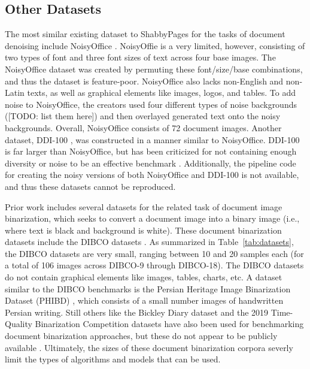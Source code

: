 \documentclass[runningheads]{llncs}
\begin{document}
\subsection{Other Datasets}
The most similar existing dataset to ShabbyPages for the tasks of document denoising include NoisyOffice \cite{ref_NoisyOfficeDatabase}.
NoisyOffie is a very limited, however, consisting of two types of font and three font sizes of text across four base images. The NoisyOffice dataset was created by permuting these font/size/base combinations, and thus the dataset is feature-poor.
NoisyOffice also lacks non-English and non-Latin texts, as well as graphical elements like images, logos, and tables.
To add noise to NoisyOffice, the creators used four different types of noise backgrounds ([TODO: list them here]) and then overlayed generated text onto the noisy backgrounds.
Overall, NoisyOffice consists of 72 document images.
Another dataset, DDI-100 \cite{ddi-100-2019}, was constructed in a manner similar to NoisyOffice.
DDI-100 is far larger than NoisyOffice, but has been criticized for not containing enough diversity or noise to be an effective benchmark \cite{detection-masking-2022}.
Additionally, the pipeline code for creating the noisy versions of both NoisyOffice and DDI-100 is not available, and thus these datasets cannot be reproduced.

Prior work includes several datasets for the related task of document image binarization, which seeks to convert a document image into a binary image (i.e., where text is black and background is white).
These document binarization datasets include the DIBCO datasets \cite{dibco-09,dibco-10,dibco-11,dibco-12,dibco-13,dibco-14,dibco-16,dibco-17,dibco-18}.
As summarized in Table~\ref{tab:datasets}, the DIBCO datasets are very small, ranging between 10 and 20 samples each (for a total of 106 images across DIBCO-9 through DIBCO-18).
The DIBCO datasets do not contain graphical elements like images, tables, charts, etc.
A dataset similar to the DIBCO benchmarks is the Persian Heritage Image Binarization Dataset (PHIBD) \cite{phibc-2012-nafchi,nafchi-2013-icdar}, which consists of a small number images of handwritten Persian writing.
Still others like the Bickley Diary dataset \cite{bickley-diary} and the 2019 Time-Quality Binarization Competition datasets \cite{2019-time-quality-competition} have also been used for benchmarking document binarization approaches, but these do not appear to be publicly available \cite{tensmeyer-binarization-review-2020}.
Ultimately, the sizes of these document binarization corpora severly limit the types of algorithms and models that can be used.
\end{document}
